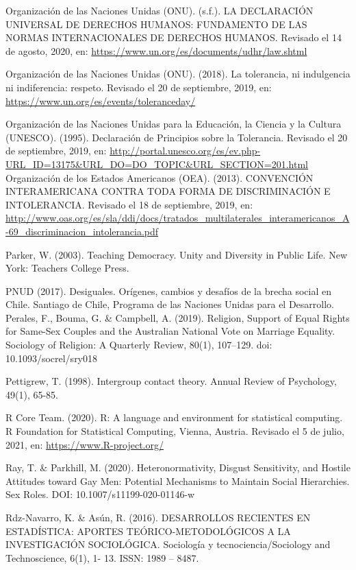 \documentclass[12pt,twoside]{templates/facsothesis}
\begin{document}
Organización de las Naciones Unidas (ONU). (s.f.). LA DECLARACIÓN UNIVERSAL DE DERECHOS HUMANOS: FUNDAMENTO DE LAS NORMAS INTERNACIONALES DE DERECHOS HUMANOS. Revisado el 14 de agosto, 2020, en: \url{https://www.un.org/es/documents/udhr/law.shtml}

Organización de las Naciones Unidas (ONU). (2018). La tolerancia, ni indulgencia ni indiferencia: respeto. Revisado el 20 de septiembre, 2019, en: \url{https://www.un.org/es/events/toleranceday/}

Organización de las Naciones Unidas para la Educación, la Ciencia y la Cultura (UNESCO). (1995). Declaración de Principios sobre la Tolerancia. Revisado el 20 de septiembre, 2019, en: \url{http://portal.unesco.org/es/ev.php-URL_ID=13175\&URL_DO=DO_TOPIC\&URL_SECTION=201.html}
Organización de los Estados Americanos (OEA). (2013). CONVENCIÓN INTERAMERICANA CONTRA TODA FORMA DE DISCRIMINACIÓN E INTOLERANCIA. Revisado el 18 de septiembre, 2019, en: \url{http://www.oas.org/es/sla/ddi/docs/tratados_multilaterales_interamericanos_A-69_discriminacion_intolerancia.pdf}

Parker, W. (2003). Teaching Democracy. Unity and Diversity in Public Life. New York: Teachers College Press.

PNUD (2017). Desiguales. Orígenes, cambios y desafíos de la brecha social en Chile. Santiago de Chile, Programa de las Naciones Unidas para el Desarrollo.
Perales, F., Bouma, G. \& Campbell, A. (2019). Religion, Support of Equal Rights for Same-Sex Couples and the Australian National Vote on Marriage Equality. Sociology of Religion: A Quarterly Review, 80(1), 107--129. doi: 10.1093/socrel/sry018

Pettigrew, T. (1998). Intergroup contact theory. Annual Review of Psychology, 49(1), 65-85.

R Core Team. (2020). R: A language and environment for statistical computing. R Foundation for Statistical Computing, Vienna, Austria. Revisado el 5 de julio, 2021, en: \url{https://www.R-project.org/}

Ray, T. \& Parkhill, M. (2020). Heteronormativity, Disgust Sensitivity, and Hostile Attitudes toward Gay Men: Potential Mechanisms to Maintain Social Hierarchies. Sex Roles. DOI: 10.1007/s11199-020-01146-w

Rdz-Navarro, K. \& Asún, R. (2016). DESARROLLOS RECIENTES EN ESTADÍSTICA: APORTES TEÓRICO-METODOLÓGICOS A LA INVESTIGACIÓN SOCIOLÓGICA. Sociología y tecnociencia/Sociology and Technoscience, 6(1), 1- 13. ISSN: 1989 -- 8487.
\end{document}
